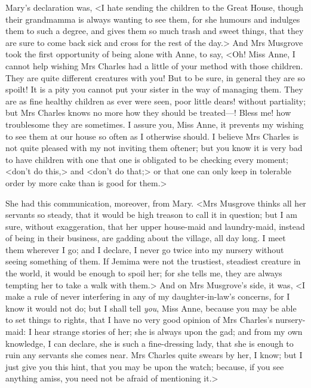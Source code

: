 Mary's declaration was, <I hate sending the children to the Great House, though their grandmamma is always wanting to see them, for she humours and indulges them to such a degree, and gives them so much trash and sweet things, that they are sure to come back sick and cross for the rest of the day.> And Mrs Musgrove took the first opportunity of being alone with Anne, to say, <Oh! Miss Anne, I cannot help wishing Mrs Charles had a little of your method with those children. They are quite different creatures with you! But to be sure, in general they are so spoilt! It is a pity you cannot put your sister in the way of managing them. They are as fine healthy children as ever were seen, poor little dears! without partiality; but Mrs Charles knows no more how they should be treated—! Bless me! how troublesome they are sometimes. I assure you, Miss Anne, it prevents my wishing to see them at our house so often as I otherwise should. I believe Mrs Charles is not quite pleased with my not inviting them oftener; but you know it is very bad to have children with one that one is obligated to be checking every moment; <don't do this,> and <don't do that;> or that one can only keep in tolerable order by more cake than is good for them.>

She had this communication, moreover, from Mary. <Mrs Musgrove thinks all her servants so steady, that it would be high treason to call it in question; but I am sure, without exaggeration, that her upper house-maid and laundry-maid, instead of being in their business, are gadding about the village, all day long. I meet them wherever I go; and I declare, I never go twice into my nursery without seeing something of them. If Jemima were not the trustiest, steadiest creature in the world, it would be enough to spoil her; for she tells me, they are always tempting her to take a walk with them.> And on Mrs Musgrove's side, it was, <I make a rule of never interfering in any of my daughter-in-law's concerns, for I know it would not do; but I shall tell \textit{you}, Miss Anne, because you may be able to set things to rights, that I have no very good opinion of Mrs Charles's nursery-maid: I hear strange stories of her; she is always upon the gad; and from my own knowledge, I can declare, she is such a fine-dressing lady, that she is enough to ruin any servants she comes near. Mrs Charles quite swears by her, I know; but I just give you this hint, that you may be upon the watch; because, if you see anything amiss, you need not be afraid of mentioning it.>

